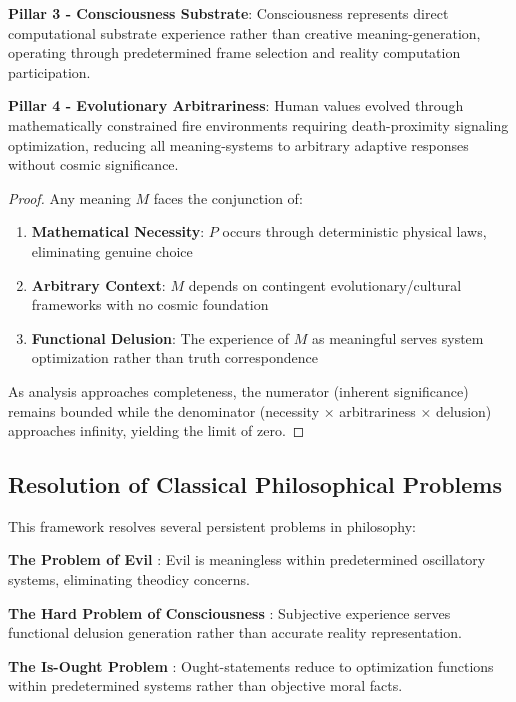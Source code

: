 \documentclass[12pt,a4paper]{article}
\begin{document}
\textbf{Pillar 3 - Consciousness Substrate}: Consciousness represents direct computational substrate experience rather than creative meaning-generation, operating through predetermined frame selection and reality computation participation.

\textbf{Pillar 4 - Evolutionary Arbitrariness}: Human values evolved through mathematically constrained fire environments requiring death-proximity signaling optimization, reducing all meaning-systems to arbitrary adaptive responses without cosmic significance.

\begin{proof}
Any meaning $M$ faces the conjunction of:
\begin{enumerate}
\item \textbf{Mathematical Necessity}: $P$ occurs through deterministic physical laws, eliminating genuine choice
\item \textbf{Arbitrary Context}: $M$ depends on contingent evolutionary/cultural frameworks with no cosmic foundation  
\item \textbf{Functional Delusion}: The experience of $M$ as meaningful serves system optimization rather than truth correspondence
\end{enumerate}

As analysis approaches completeness, the numerator (inherent significance) remains bounded while the denominator (necessity × arbitrariness × delusion) approaches infinity, yielding the limit of zero.
\end{proof}

\subsection{Resolution of Classical Philosophical Problems}

This framework resolves several persistent problems in philosophy:

\textbf{The Problem of Evil} \citep{mackie1955evil}: Evil is meaningless within predetermined oscillatory systems, eliminating theodicy concerns.

\textbf{The Hard Problem of Consciousness} \citep{chalmers1995facing}: Subjective experience serves functional delusion generation rather than accurate reality representation.

\textbf{The Is-Ought Problem} \citep{hume1739treatise}: Ought-statements reduce to optimization functions within predetermined systems rather than objective moral facts.
\end{document}
